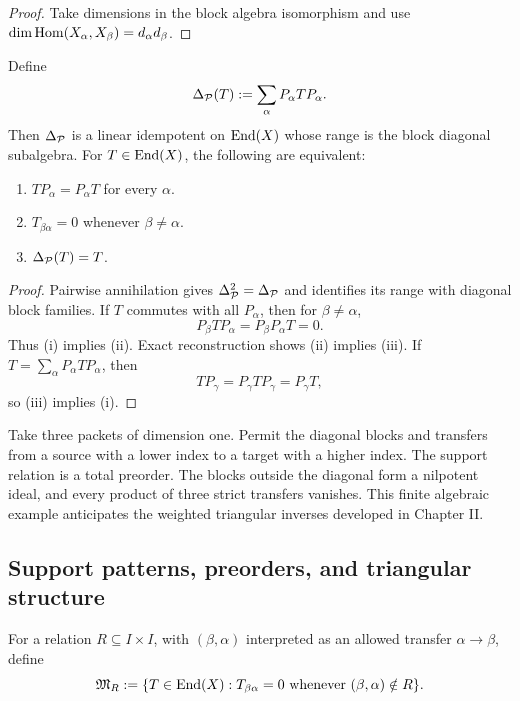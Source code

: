\begin{proof}
Take dimensions in the block algebra isomorphism and use $\dim\operatorname{Hom}(X_\alpha,X_\beta)=d_\alpha d_\beta$.
\end{proof}

\begin{proposition}
\label{prop:block-diagonal-projection}
Define
\[
\Delta_{\mathcal P}(T):=\sum_{\alpha}P_\alpha TP_\alpha.
\]
Then $\Delta_{\mathcal P}$ is a linear idempotent on $\operatorname{End}(X)$ whose range is the block diagonal subalgebra.  For $T\in\operatorname{End}(X)$, the following are equivalent:
\begin{enumerate}[label=(\roman*)]
\item $TP_\alpha=P_\alpha T$ for every $\alpha$.
\item $T_{\beta\alpha}=0$ whenever $\beta\neq\alpha$.
\item $\Delta_{\mathcal P}(T)=T$.
\end{enumerate}
\end{proposition}

\begin{proof}
Pairwise annihilation gives $\Delta_{\mathcal P}^2=\Delta_{\mathcal P}$ and identifies its range with diagonal block families.  If $T$ commutes with all $P_\alpha$, then for $\beta\neq\alpha$,
\[
P_\beta TP_\alpha=P_\beta P_\alpha T=0.
\]
Thus (i) implies (ii).  Exact reconstruction shows (ii) implies (iii).  If $T=\sum_\alpha P_\alpha TP_\alpha$, then
\[
TP_\gamma=P_\gamma TP_\gamma=P_\gamma T,
\]
so (iii) implies (i).
\end{proof}

\begin{microexample}[title={Lower triangular support}]
Take three packets of dimension one.  Permit the diagonal blocks and transfers from a source with a lower index to a target with a higher index.  The support relation is a total preorder.  The blocks outside the diagonal form a nilpotent ideal, and every product of three strict transfers vanishes.  This finite algebraic example anticipates the weighted triangular inverses developed in Chapter II.
\end{microexample}


\subsection{Support patterns, preorders, and triangular structure}
\begin{definition}
\label{def:support-relation}
For a relation $R\subseteq I\times I$, with $(\beta,\alpha)$ interpreted as an allowed transfer $\alpha\to\beta$, define
\[
\mathfrak M_R
:=
\{T\in\operatorname{End}(X):T_{\beta\alpha}=0\text{ whenever }(\beta,\alpha)\notin R\}.
\]
\end{definition}


